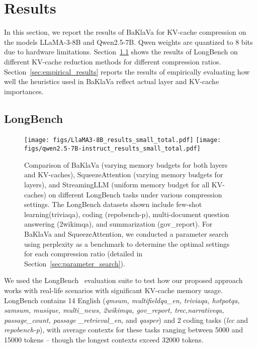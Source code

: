 \section{Results}\label{sec:results} 
In this section, we report the results of BaKlaVa for KV-cache compression on the models LLaMA-3-8B and Qwen2.5-7B. %
Qwen weights are quantized to 8 bits due to hardware limitations. Section~\ref{sec:longbench_results} shows the results of LongBench on different KV-cache reduction methods for different compression ratios. Section~\ref{sec:empirical_results} reports the results of empirically evaluating how well the heuristics used in BaKlaVa reflect actual layer and KV-cache importances.

\subsection{LongBench}
\label{sec:longbench_results}


\begin{figure*}[hbt!]
    \centering
    
    \texttt{[image: figs/LlaMA3-8B\_results\_small\_total.pdf]}
    \texttt{[image: figs/qwen2.5-7B-instruct\_results\_small\_total.pdf]}

    \caption{Comparison of BaKlaVa (varying memory budgets for both layers and KV-caches), SqueezeAttention (varying memory budgets for layers), and StreamingLLM (uniform memory budget for all KV-caches) on different LongBench tasks under various compression settings. The LongBench datasets shown include few-shot learning(triviaqa), coding (repobench-p), multi-document question answering (2wikimqa), and summarization (gov\_report). For BaKlaVa and SqueezeAttention, we conducted a parameter search using perplexity as a benchmark to determine the optimal settings for each compression ratio (detailed in Section~\ref{sec:parameter_search}).}

    \label{fig:longbench_results_small}
\end{figure*}

We used the LongBench~\cite{bai2023longbench} evaluation suite to test how our proposed approach works with real-life scenarios with significant KV-cache memory usage. LongBench contains 14 English (\textit{qmsum, multifieldqa\_en, triviaqa, hotpotqa, samsum, musique, multi\_news, 2wikimqa, gov\_report, trec,narrativeqa, passage\_count, passage \_retrieval\_en,} and \textit{qasper}) and 2 coding tasks (\textit{lcc} and \textit{repobench-p}), with average contexts for these tasks ranging between 5000 and 15000 tokens -- though the longest contexts exceed 32000 tokens.


